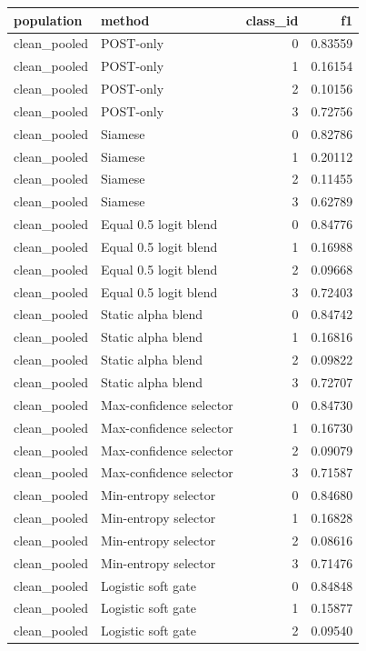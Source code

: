 \begin{tabular}{llrr}
\toprule
population & method & class\_id & f1 \\
\midrule
clean\_pooled & POST-only & 0 & 0.83559 \\
clean\_pooled & POST-only & 1 & 0.16154 \\
clean\_pooled & POST-only & 2 & 0.10156 \\
clean\_pooled & POST-only & 3 & 0.72756 \\
clean\_pooled & Siamese & 0 & 0.82786 \\
clean\_pooled & Siamese & 1 & 0.20112 \\
clean\_pooled & Siamese & 2 & 0.11455 \\
clean\_pooled & Siamese & 3 & 0.62789 \\
clean\_pooled & Equal 0.5 logit blend & 0 & 0.84776 \\
clean\_pooled & Equal 0.5 logit blend & 1 & 0.16988 \\
clean\_pooled & Equal 0.5 logit blend & 2 & 0.09668 \\
clean\_pooled & Equal 0.5 logit blend & 3 & 0.72403 \\
clean\_pooled & Static alpha blend & 0 & 0.84742 \\
clean\_pooled & Static alpha blend & 1 & 0.16816 \\
clean\_pooled & Static alpha blend & 2 & 0.09822 \\
clean\_pooled & Static alpha blend & 3 & 0.72707 \\
clean\_pooled & Max-confidence selector & 0 & 0.84730 \\
clean\_pooled & Max-confidence selector & 1 & 0.16730 \\
clean\_pooled & Max-confidence selector & 2 & 0.09079 \\
clean\_pooled & Max-confidence selector & 3 & 0.71587 \\
clean\_pooled & Min-entropy selector & 0 & 0.84680 \\
clean\_pooled & Min-entropy selector & 1 & 0.16828 \\
clean\_pooled & Min-entropy selector & 2 & 0.08616 \\
clean\_pooled & Min-entropy selector & 3 & 0.71476 \\
clean\_pooled & Logistic soft gate & 0 & 0.84848 \\
clean\_pooled & Logistic soft gate & 1 & 0.15877 \\
clean\_pooled & Logistic soft gate & 2 & 0.09540 \\

\end{tabular}
